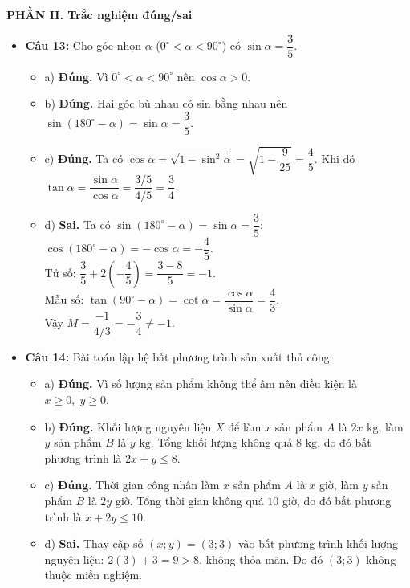 \documentclass[12pt,a4paper]{article}
\begin{document}
\vspace{0.15cm}
\textbf{PHẦN II. Trắc nghiệm đúng/sai}
\begin{itemize}[leftmargin=0.6cm, itemsep=1.5pt, topsep=1pt]
    \item \textbf{Câu 13:} Cho góc nhọn $\alpha$ ($0^\circ < \alpha < 90^\circ$) có $\sin \alpha = \dfrac{3}{5}$.
    \begin{itemize}[itemsep=1pt]
        \item a) \textbf{Đúng.} Vì $0^\circ < \alpha < 90^\circ$ nên $\cos \alpha > 0$.
        \item b) \textbf{Đúng.} Hai góc bù nhau có sin bằng nhau nên $\sin(180^\circ - \alpha) = \sin \alpha = \dfrac{3}{5}$.
        \item c) \textbf{Đúng.} Ta có $\cos \alpha = \sqrt{1 - \sin^2 \alpha} = \sqrt{1 - \dfrac{9}{25}} = \dfrac{4}{5}$. Khi đó $\tan \alpha = \dfrac{\sin \alpha}{\cos \alpha} = \dfrac{3/5}{4/5} = \dfrac{3}{4}$.
        \item d) \textbf{Sai.} Ta có $\sin(180^\circ - \alpha) = \sin \alpha = \dfrac{3}{5}$; $\cos(180^\circ - \alpha) = -\cos \alpha = -\dfrac{4}{5}$.\\
        Tử số: $\dfrac{3}{5} + 2\left(-\dfrac{4}{5}\right) = \dfrac{3 - 8}{5} = -1$.\\
        Mẫu số: $\tan(90^\circ - \alpha) = \cot \alpha = \dfrac{\cos \alpha}{\sin \alpha} = \dfrac{4}{3}$.\\
        Vậy $M = \dfrac{-1}{4/3} = -\dfrac{3}{4} \ne -1$.
    \end{itemize}

    \item \textbf{Câu 14:} Bài toán lập hệ bất phương trình sản xuất thủ công:
    \begin{itemize}[itemsep=1pt]
        \item a) \textbf{Đúng.} Vì số lượng sản phẩm không thể âm nên điều kiện là $x \ge 0,\; y \ge 0$.
        \item b) \textbf{Đúng.} Khối lượng nguyên liệu $X$ để làm $x$ sản phẩm $A$ là $2x\text{ kg}$, làm $y$ sản phẩm $B$ là $y\text{ kg}$. Tổng khối lượng không quá $8\text{ kg}$, do đó bất phương trình là $2x + y \le 8$.
        \item c) \textbf{Đúng.} Thời gian công nhân làm $x$ sản phẩm $A$ là $x$ giờ, làm $y$ sản phẩm $B$ là $2y$ giờ. Tổng thời gian không quá $10$ giờ, do đó bất phương trình là $x + 2y \le 10$.
        \item d) \textbf{Sai.} Thay cặp số $(x; y) = (3; 3)$ vào bất phương trình khối lượng nguyên liệu: $2(3) + 3 = 9 > 8$, không thỏa mãn. Do đó $(3; 3)$ không thuộc miền nghiệm.
    \end{itemize}
\end{itemize}
\end{document}
